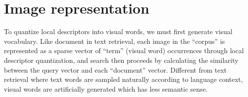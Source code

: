 \section{Image representation}

To quantize local descriptors into visual words, we must first generate visual vocabulary. Like document
in text retrieval, each image in the “corpus” is represented as a sparse vector of “term” (visual
word) occurrences through local descriptor quantization, and search then proceeds by calculating
the similarity between the query vector and each “document” vector. Different from text retrieval
where text words are sampled naturally according to language context, visual words are artificially
generated which has less semantic sense.\cite{DBLP:journals/corr/abs-1304-5168}